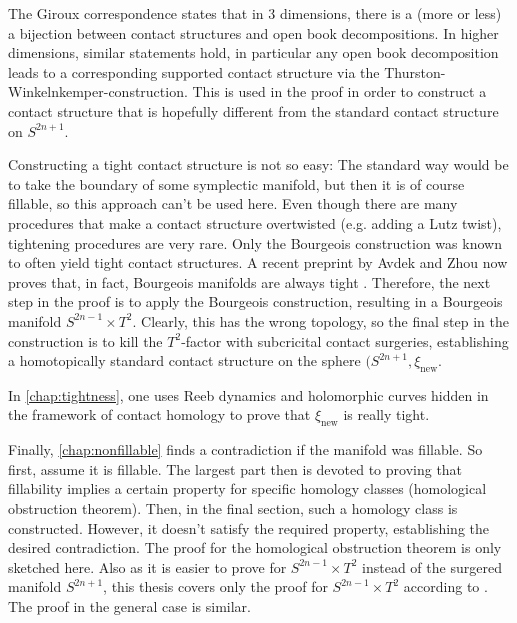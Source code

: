 The Giroux correspondence states that in 3 dimensions, there is a (more or less) a bijection between contact structures
and open book decompositions.
In higher dimensions, similar statements hold, in particular any open book decomposition leads to a corresponding supported
contact structure via the Thurston-Winkelnkemper-construction.
This is used in the proof in order to construct a contact structure that is hopefully different from the standard contact structure on $S^{2n+1}$.

Constructing a tight contact structure is not so easy: The standard way would be to take the boundary of some symplectic manifold,
but then it is of course fillable, so this approach can't be used here.
Even though there are many procedures that make a contact structure overtwisted (e.g. adding a Lutz twist), tightening procedures are very rare.
Only the Bourgeois construction was known to often yield tight contact structures. 
A recent preprint by Avdek and Zhou now proves that, in fact, Bourgeois manifolds are always tight \cite{AZ24}.
Therefore, the next step in the proof is to apply the Bourgeois construction, resulting in a Bourgeois manifold $S^{2n-1} \times T^2$.
Clearly, this has the wrong topology, so the final step in the construction is to kill the $T^2$-factor with
subcricital contact surgeries, establishing a homotopically standard contact structure on the sphere $(S^{2n+1},\xi_\text{new}$.

In \cref{chap:tightness}, one uses Reeb dynamics and holomorphic curves hidden in the framework of contact homology to prove that $\xi_\text{new}$
is really tight.

Finally, \cref{chap:nonfillable} finds a contradiction if the manifold was fillable. So first, assume it is fillable.
The largest part then is devoted to proving that fillability implies a certain property for specific homology classes
(homological obstruction theorem).
Then, in the final section, such a homology class is constructed.
However, it doesn't satisfy the required property, establishing the desired contradiction.
The proof for the homological obstruction theorem is only sketched here.
Also as it is easier to prove for $S^{2n-1} \times T^2$ instead of the surgered manifold $S^{2n+1}$,
this thesis covers only the proof for $S^{2n-1} \times T^2$ according to \cite{BGM22}. 
The proof in the general case is similar.